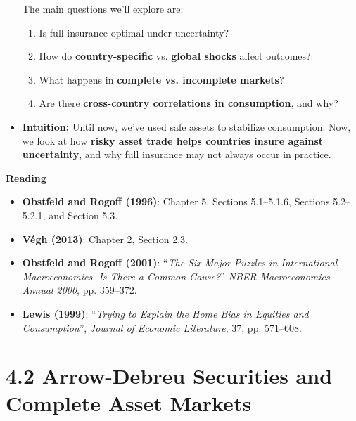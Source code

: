 \documentclass[12pt]{article}
\begin{document}
\begin{itemize}
The main questions we’ll explore are:
  \begin{enumerate}
    \item Is full insurance optimal under uncertainty?
    \item How do \textbf{country-specific} vs. \textbf{global shocks} affect outcomes?
    \item What happens in \textbf{complete vs. incomplete markets}?
    \item Are there \textbf{cross-country correlations in consumption}, and why?
  \end{enumerate}

\item \textbf{Intuition:} Until now, we’ve used safe assets to stabilize consumption. Now, we look at how \textbf{risky asset trade helps countries insure against uncertainty}, and why full insurance may not always occur in practice.
\end{itemize}

\newpage

\underline{\textbf{Reading}}

\begin{itemize}
\item \textbf{Obstfeld and Rogoff (1996)}: Chapter 5, Sections 5.1–5.1.6, Sections 5.2–5.2.1, and Section 5.3.

\item \textbf{Végh (2013)}: Chapter 2, Section 2.3.

\item \textbf{Obstfeld and Rogoff (2001)}: “\textit{The Six Major Puzzles in International Macroeconomics. Is There a Common Cause?}” \textit{NBER Macroeconomics Annual 2000}, pp. 359–372.

\item \textbf{Lewis (1999)}: “\textit{Trying to Explain the Home Bias in Equities and Consumption}”, \textit{Journal of Economic Literature}, 37, pp. 571–608.
\end{itemize}

\section*{\noindent\textbf{4.2 Arrow-Debreu Securities and Complete Asset Markets}}
\end{document}
